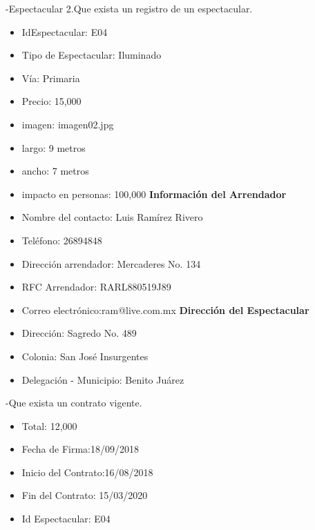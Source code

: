 -Espectacular 2.Que exista un registro de un espectacular. 
\begin{itemize}
    \item IdEspectacular: E04
    \item Tipo de Espectacular: Iluminado
    \item Vía: Primaria
    \item Precio: 15,000
    \item imagen: imagen02.jpg
    \item largo: 9 metros
    \item ancho: 7 metros
    \item impacto en personas: 100,000
    \textbf{Información del Arrendador}
    \item Nombre del contacto: Luis Ramírez Rivero
    \item Teléfono: 26894848
    \item Dirección arrendador: Mercaderes No. 134
    \item RFC Arrendador: RARL880519J89
    \item Correo electrónico:ram@live.com.mx
    \textbf{Dirección del Espectacular}
    \item Dirección: Sagredo No. 489
    \item Colonia: San José Insurgentes
    \item Delegación - Municipio: Benito Juárez
\end{itemize}
-Que exista un contrato vigente.
\begin{itemize}
    \item  Total: 12,000
    \item  Fecha de Firma:18/09/2018
    \item  Inicio del Contrato:16/08/2018
    \item  Fin del Contrato: 15/03/2020
    \item  Id Espectacular: E04
\end{itemize}

